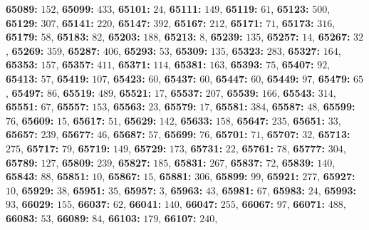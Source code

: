 \textsf{\bfseries 65089:} $152$, \textsf{\bfseries 65099:} $433$, \textsf{\bfseries 65101:} $24$, \textsf{\bfseries 65111:} $149$, \textsf{\bfseries 65119:} $61$, \textsf{\bfseries 65123:} $500$, \textsf{\bfseries 65129:} $307$, \textsf{\bfseries 65141:} $220$, \textsf{\bfseries 65147:} $392$, \textsf{\bfseries 65167:} $212$, \textsf{\bfseries 65171:} $71$, \textsf{\bfseries 65173:} $316$, \textsf{\bfseries 65179:} $58$, \textsf{\bfseries 65183:} $82$, \textsf{\bfseries 65203:} $188$, \textsf{\bfseries 65213:} $8$, \textsf{\bfseries 65239:} $135$, \textsf{\bfseries 65257:} $14$, \textsf{\bfseries 65267:} $32$, \textsf{\bfseries 65269:} $359$, \textsf{\bfseries 65287:} $406$, \textsf{\bfseries 65293:} $53$, \textsf{\bfseries 65309:} $135$, \textsf{\bfseries 65323:} $283$, \textsf{\bfseries 65327:} $164$, \textsf{\bfseries 65353:} $157$, \textsf{\bfseries 65357:} $411$, \textsf{\bfseries 65371:} $114$, \textsf{\bfseries 65381:} $163$, \textsf{\bfseries 65393:} $75$, \textsf{\bfseries 65407:} $92$, \textsf{\bfseries 65413:} $57$, \textsf{\bfseries 65419:} $107$, \textsf{\bfseries 65423:} $60$, \textsf{\bfseries 65437:} $60$, \textsf{\bfseries 65447:} $60$, \textsf{\bfseries 65449:} $97$, \textsf{\bfseries 65479:} $65$, \textsf{\bfseries 65497:} $86$, \textsf{\bfseries 65519:} $489$, \textsf{\bfseries 65521:} $17$, \textsf{\bfseries 65537:} $207$, \textsf{\bfseries 65539:} $166$, \textsf{\bfseries 65543:} $314$, \textsf{\bfseries 65551:} $67$, \textsf{\bfseries 65557:} $153$, \textsf{\bfseries 65563:} $23$, \textsf{\bfseries 65579:} $17$, \textsf{\bfseries 65581:} $384$, \textsf{\bfseries 65587:} $48$, \textsf{\bfseries 65599:} $76$, \textsf{\bfseries 65609:} $15$, \textsf{\bfseries 65617:} $51$, \textsf{\bfseries 65629:} $142$, \textsf{\bfseries 65633:} $158$, \textsf{\bfseries 65647:} $235$, \textsf{\bfseries 65651:} $33$, \textsf{\bfseries 65657:} $239$, \textsf{\bfseries 65677:} $46$, \textsf{\bfseries 65687:} $57$, \textsf{\bfseries 65699:} $76$, \textsf{\bfseries 65701:} $71$, \textsf{\bfseries 65707:} $32$, \textsf{\bfseries 65713:} $275$, \textsf{\bfseries 65717:} $79$, \textsf{\bfseries 65719:} $149$, \textsf{\bfseries 65729:} $173$, \textsf{\bfseries 65731:} $22$, \textsf{\bfseries 65761:} $78$, \textsf{\bfseries 65777:} $304$, \textsf{\bfseries 65789:} $127$, \textsf{\bfseries 65809:} $239$, \textsf{\bfseries 65827:} $185$, \textsf{\bfseries 65831:} $267$, \textsf{\bfseries 65837:} $72$, \textsf{\bfseries 65839:} $140$, \textsf{\bfseries 65843:} $88$, \textsf{\bfseries 65851:} $10$, \textsf{\bfseries 65867:} $15$, \textsf{\bfseries 65881:} $306$, \textsf{\bfseries 65899:} $99$, \textsf{\bfseries 65921:} $277$, \textsf{\bfseries 65927:} $10$, \textsf{\bfseries 65929:} $38$, \textsf{\bfseries 65951:} $35$, \textsf{\bfseries 65957:} $3$, \textsf{\bfseries 65963:} $43$, \textsf{\bfseries 65981:} $67$, \textsf{\bfseries 65983:} $24$, \textsf{\bfseries 65993:} $93$, \textsf{\bfseries 66029:} $155$, \textsf{\bfseries 66037:} $62$, \textsf{\bfseries 66041:} $140$, \textsf{\bfseries 66047:} $255$, \textsf{\bfseries 66067:} $97$, \textsf{\bfseries 66071:} $488$, \textsf{\bfseries 66083:} $53$, \textsf{\bfseries 66089:} $84$, \textsf{\bfseries 66103:} $179$, \textsf{\bfseries 66107:} $240$, 
